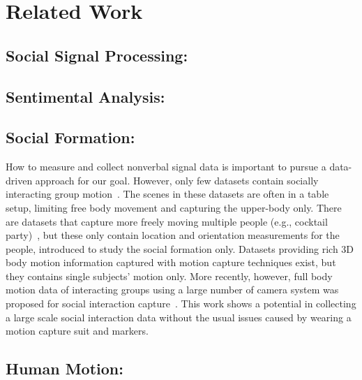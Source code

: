 \section{Related Work}

\subsection{Social Signal Processing:}

\subsection{Sentimental Analysis:}

\subsection{Social Formation:}

How to measure and collect nonverbal signal data is important to pursue a data-driven approach for our goal. However, only few datasets contain socially interacting group motion~\cite{alameda2016salsa, mccowan2005ami, lepri2012connecting, rehg2013decoding}. The scenes in these datasets are often in a table setup, limiting free body movement and capturing the upper-body only. There are datasets that capture more freely moving multiple people (e.g., cocktail party)~\cite{Zen-10, Cristani-11, farenzena2009social}, but these only contain location and orientation measurements for the people, introduced to study the social formation only. Datasets providing rich 3D body motion information captured with motion capture techniques exist, but they contains single subjects' motion only\cite{gross2001cmu, h36m_pami, sigal2010humaneva}. More recently, however, full body motion data of interacting groups using a large number of camera system was proposed for social interaction capture~\cite{Joo-15}. This work shows a potential in collecting a large scale social interaction data without the usual issues caused by wearing a motion capture suit and markers.

\subsection{Human Motion:}



